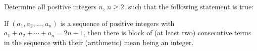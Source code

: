 Determine all positive integers $n$, $n\ge2$, such that the following statement is true:

If $(a_1,a_2,...,a_n)$ is a sequence of positive integers with $a_1+a_2+\cdots+a_n=2n-1$, then there is block of (at least two) consecutive terms in the sequence with their (arithmetic) mean being an integer.